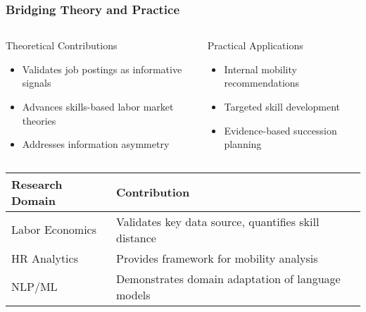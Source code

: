 \documentclass[aspectratio=169]{beamer}
\begin{document}
\begin{frame}
\frametitle{Bridging Theory and Practice}

\begin{columns}
\begin{column}{0.48\textwidth}
\begin{block}{Theoretical Contributions}
\begin{itemize}
\item Validates job postings as informative signals
\item Advances skills-based labor market theories
\item Addresses information asymmetry
\end{itemize}
\end{block}
\end{column}

\begin{column}{0.48\textwidth}
\begin{block}{Practical Applications}
\begin{itemize}
\item Internal mobility recommendations
\item Targeted skill development
\item Evidence-based succession planning
\end{itemize}
\end{block}
\end{column}
\end{columns}
\vspace{1em}

\begin{center}
\begin{tabular}{|l|l|}
\hline
\textbf{Research Domain} & \textbf{Contribution} \\
\hline
Labor Economics & Validates key data source, quantifies skill distance \\
HR Analytics & Provides framework for mobility analysis \\
NLP/ML & Demonstrates domain adaptation of language models \\
\hline
\end{tabular}
\end{center}
\end{frame}
\end{document}
